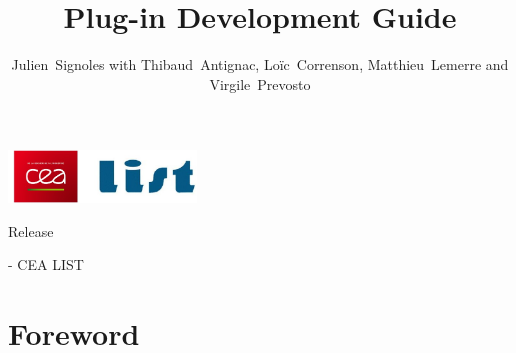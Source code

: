 \documentclass[web,svgnames]{frama-c-book}
\begin{document}
\sloppy
{}

\begin{titlepage}
\includegraphics[height=14mm]{../images/cealistlogo.jpg}
\hfill~
\vfill
\title{Plug-in Development Guide}%
{Release \framacversion}
\author{Julien~Signoles with Thibaud~Antignac, Loïc~Correnson, Matthieu~Lemerre
and Virgile~Prevosto}
\begin{center}
  \fcaffiliationen
\end{center}
\vfill
\begin{flushleft}
  -{\the\year} CEA LIST
\end{flushleft}
\end{titlepage}

\cleardoublepage
\markright{}
\tableofcontents








\chapter*{Foreword}
\markright{}
\end{document}

